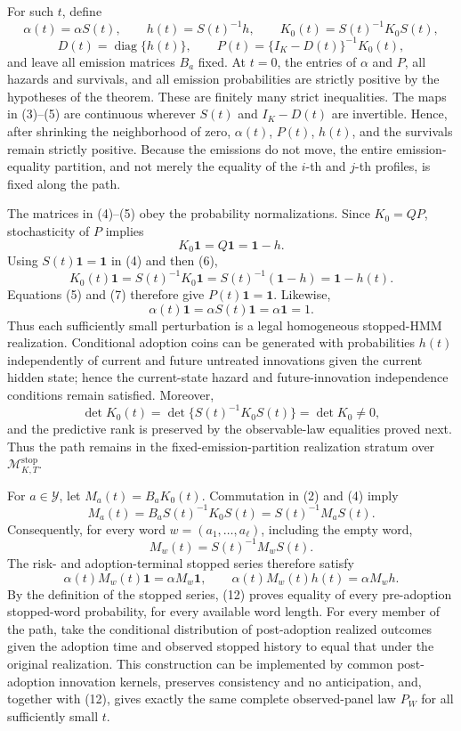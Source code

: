 For such \(t\), define
\[
 \alpha(t)=\alpha S(t),\qquad h(t)=S(t)^{-1}h,\qquad
 K_0(t)=S(t)^{-1}K_0S(t),                                      \tag{4}
\]
\[
 D(t)=\operatorname{diag}\{h(t)\},\qquad
 P(t)=\{I_K-D(t)\}^{-1}K_0(t),                                \tag{5}
\]
and leave all emission matrices \(B_a\) fixed. At \(t=0\), the entries of \(\alpha\) and \(P\), all hazards and survivals, and all emission probabilities are strictly positive by the hypotheses of the theorem. These are finitely many strict inequalities. The maps in (3)--(5) are continuous wherever \(S(t)\) and \(I_K-D(t)\) are invertible. Hence, after shrinking the neighborhood of zero, \(\alpha(t)\), \(P(t)\), \(h(t)\), and the survivals remain strictly positive. Because the emissions do not move, the entire emission-equality partition, and not merely the equality of the \(i\)-th and \(j\)-th profiles, is fixed along the path.

The matrices in (4)--(5) obey the probability normalizations. Since \(K_0=QP\), stochasticity of \(P\) implies
\[
 K_0\mathbf 1=Q\mathbf 1=\mathbf 1-h.                         \tag{6}
\]
Using \(S(t)\mathbf 1=\mathbf 1\) in (4) and then (6),
\[
 K_0(t)\mathbf 1
 =S(t)^{-1}K_0\mathbf 1
 =S(t)^{-1}(\mathbf 1-h)
 =\mathbf 1-h(t).                                               \tag{7}
\]
Equations (5) and (7) therefore give \(P(t)\mathbf 1=\mathbf 1\). Likewise,
\[
 \alpha(t)\mathbf 1=\alpha S(t)\mathbf 1=\alpha\mathbf 1=1. \tag{8}
\]
Thus each sufficiently small perturbation is a legal homogeneous stopped-HMM realization. Conditional adoption coins can be generated with probabilities \(h(t)\) independently of current and future untreated innovations given the current hidden state; hence the current-state hazard and future-innovation independence conditions remain satisfied. Moreover,
\[
 \det K_0(t)=\det\{S(t)^{-1}K_0S(t)\}=\det K_0\ne0,          \tag{9}
\]
and the predictive rank is preserved by the observable-law equalities proved next. Thus the path remains in the fixed-emission-partition realization stratum over \(\mathcal M^{\mathrm{stop}}_{K,T}\).

For \(a\in\mathcal Y\), let \(M_a(t)=B_aK_0(t)\). Commutation in (2) and (4) imply
\[
 M_a(t)=B_aS(t)^{-1}K_0S(t)=S(t)^{-1}M_aS(t).                 \tag{10}
\]
Consequently, for every word \(w=(a_1,\ldots,a_\ell)\), including the empty word,
\[
 M_w(t)=S(t)^{-1}M_wS(t).                                     \tag{11}
\]
The risk- and adoption-terminal stopped series therefore satisfy
\[
 \alpha(t)M_w(t)\mathbf 1
 =\alpha M_w\mathbf 1,\qquad
 \alpha(t)M_w(t)h(t)=\alpha M_wh.                             \tag{12}
\]
By the definition of the stopped series, (12) proves equality of every pre-adoption stopped-word probability, for every available word length. For every member of the path, take the conditional distribution of post-adoption realized outcomes given the adoption time and observed stopped history to equal that under the original realization. This construction can be implemented by common post-adoption innovation kernels, preserves consistency and no anticipation, and, together with (12), gives exactly the same complete observed-panel law \(P_W\) for all sufficiently small \(t\).

